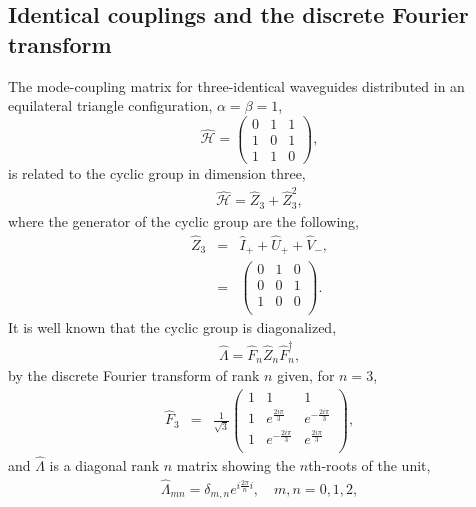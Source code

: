 \documentclass[9pt,twocolumn,twoside]{osajnl}
\begin{document}
\subsection{Identical couplings and the discrete Fourier transform}

The mode-coupling matrix for three-identical waveguides distributed in an equilateral triangle configuration, $\alpha = \beta = 1$, 
\begin{equation}
\hat{\mathcal{H}}=\left( \begin{array}{ccc}
0 & 1 & 1 \\
1 & 0 & 1 \\
1 & 1 & 0 \end{array} \right),	 
\end{equation}
is related to the cyclic group in dimension three, 
\begin{eqnarray}
\hat{\mathcal{H}} =  \hat{Z}_{3} + \hat{Z}_{3}^{2} ,
\end{eqnarray}
where the generator of the cyclic group are the following, 
\begin{eqnarray}
\hat{Z}_{3} &=& \hat{I}_{+} + \hat{U}_{+} + \hat{V}_{-}, \nonumber \\
&=&\left(
\begin{array}{ccc}
 0 & 1 & 0 \\
 0 & 0 & 1 \\
 1 & 0 & 0 \\
\end{array}\right).
\end{eqnarray}
It is well known that the cyclic group is diagonalized, 
\begin{eqnarray}
\hat{\Lambda} = \hat{F}_{n} \hat{Z}_{n} \hat{F}_{n}^{\dagger},
\end{eqnarray}
by the discrete Fourier transform of rank $n$ given, for $n=3$,
\begin{eqnarray}
\hat{F}_{3} &=& 
\frac{1}{\sqrt{3}}
\left(
\begin{array}{ccc}
 1 & 1 & 1 \\
 1 & e^{\frac{2 i \pi}{3}} & e^{-\frac{2 i \pi}{3}} \\
 1 & e^{-\frac{2 i \pi}{3}} & e^{\frac{2 i \pi}{3}} \\
\end{array}\right),
\end{eqnarray}
and $\hat{\Lambda}$ is a diagonal rank $n$ matrix showing the $n$th-roots of the unit,
\begin{eqnarray}
\hat{\Lambda}_{mn} = \delta_{m,n} e^{ i \frac{2 \pi}{n} i}, \quad  m,n = 0,1,2,
\end{eqnarray} 
\end{document}
